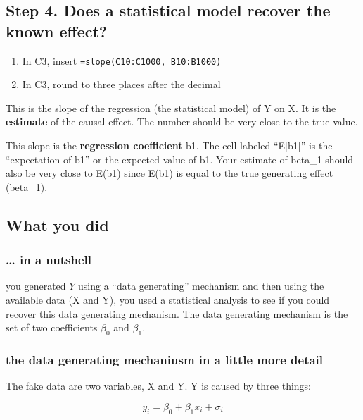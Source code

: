 \documentclass[]{book}
\providecommand{\tightlist}{%
  \setlength{\itemsep}{0pt}\setlength{\parskip}{0pt}}
\begin{document}
\subsection{Step 4. Does a statistical model recover the known
effect?}\label{step-4.-does-a-statistical-model-recover-the-known-effect}

\begin{enumerate}
\def\labelenumi{\arabic{enumi}.}
\tightlist
\item
  In C3, insert \texttt{=slope(C10:C1000,\ B10:B1000)}
\item
  In C3, round to three places after the decimal
\end{enumerate}

This is the slope of the regression (the statistical model) of Y on X.
It is the \textbf{estimate} of the causal effect. The number should be
very close to the true value.

This slope is the \textbf{regression coefficient} b1. The cell labeled
``E{[}b1{]}'' is the ``expectation of b1'' or the expected value of b1.
Your estimate of beta\_1 should also be very close to E(b1) since E(b1)
is equal to the true generating effect (beta\_1).

\subsection{What you did}\label{what-you-did}

\subsubsection{\ldots{} in a nutshell}\label{in-a-nutshell}

you generated \(Y\) using a ``data generating'' mechanism and then using
the available data (X and Y), you used a statistical analysis to see if
you could recover this data generating mechanism. The data generating
mechanism is the set of two coefficients \(\beta_0\) and \(\beta_1\).

\subsubsection{the data generating mechaniusm in a little more
detail}\label{the-data-generating-mechaniusm-in-a-little-more-detail}

The fake data are two variables, X and Y. Y is caused by three things:

\begin{equation}
y_i = \beta_0 + \beta_1 x_i + \sigma_i
\end{equation}
\end{document}
